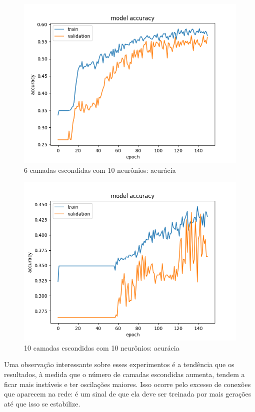 \documentclass[11pt]{article}
\begin{document}
\begin{figure}
	\includegraphics[width=\linewidth]{exp/Figure_6.png}
	\caption{6 camadas escondidas com 10 neurônios: acurácia}
	\label{fig:f4}
\end{figure}

\begin{figure}
	\includegraphics[width=\linewidth]{exp/Figure_7.png}
	\caption{10 camadas escondidas com 10 neurônios: acurácia}
	\label{fig:f4}
\end{figure}


Uma observação interessante sobre esses experimentos é a tendência que os resultados, à medida que o número de camadas escondidas aumenta, tendem a ficar mais instáveis e ter oscilações maiores. Isso ocorre pelo excesso de conexões que aparecem na rede: é um sinal de que ela deve ser treinada por mais gerações até que isso se estabilize. 
\end{document}
